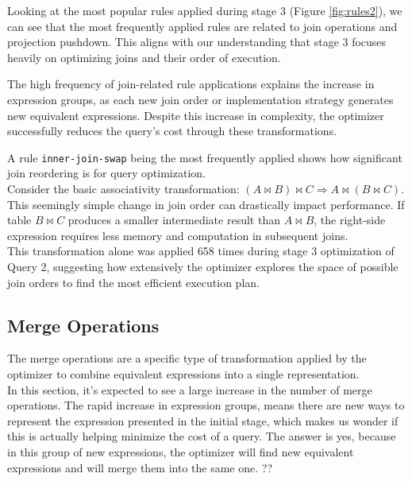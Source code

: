 \documentclass[a4paper,12pt]{scrreprt}
\begin{document}
Looking at the most popular rules applied during stage 3 (Figure \ref{fig:rules2}), we can see that the most frequently applied rules are related to join operations and projection pushdown. This aligns with our understanding that stage 3 focuses heavily on optimizing joins and their order of execution.

The high frequency of join-related rule applications explains the increase in expression groups, as each new join order or implementation strategy generates new equivalent expressions. Despite this increase in complexity, the optimizer successfully reduces the query's cost through these transformations.

A rule \texttt{inner-join-swap} being the most frequently applied shows how significant join reordering is for query optimization. \\

Consider the basic associativity transformation: $(A \bowtie B) \bowtie C \Rightarrow A \bowtie (B \bowtie C)$. This seemingly simple change in join order can drastically impact performance. If table $B \bowtie C$ produces a smaller intermediate result than $A \bowtie B$, the right-side expression requires less memory and computation in subsequent joins. \\
This transformation alone was applied 658 times during stage 3 optimization of Query 2, suggesting how extensively the optimizer explores the space of possible join orders to find the most efficient execution plan.

\subsection{Merge Operations}

The merge operations are a specific type of transformation applied by the optimizer to combine equivalent expressions into a single representation. \\
In this section, it's expected to see a large increase in the number of merge operations. The rapid increase in expression groups, means there are new ways to represent the expression presented in the initial stage, which makes us wonder if this is actually helping minimize the cost of a query. The answer is yes, because in this group of new expressions, the optimizer will find new equivalent expressions and will merge them into the same one. ?? \\
\end{document}
